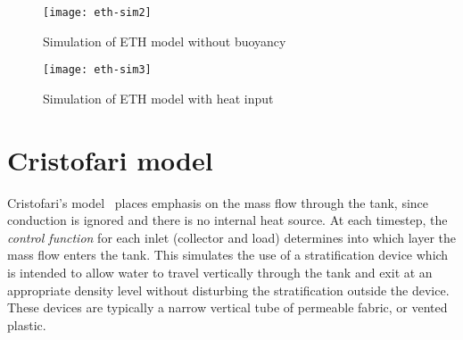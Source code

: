 \documentclass{article}
\begin{document}
\begin{figure}
   \centering
   \texttt{[image: eth-sim2]}
   \caption{Simulation of ETH model without buoyancy}
   \label{fig:eth-sim2}
\end{figure}

\begin{figure}
   \centering
   \texttt{[image: eth-sim3]}
   \caption{Simulation of ETH model with heat input}
   \label{fig:eth-sim3}
\end{figure}

\section{Cristofari model}

Cristofari's model~\cite{Cristofari02} places emphasis on the mass flow through the tank, since conduction is ignored and there is no internal heat source.
At each timestep, the \emph{control function} for each inlet (collector and load) determines into which layer the mass flow enters the tank.
This simulates the use of a stratification device which is intended to allow water to travel vertically through the tank and exit at an appropriate density level without disturbing the stratification outside the device.
These devices are typically a narrow vertical tube of permeable fabric, or vented plastic.
\end{document}

